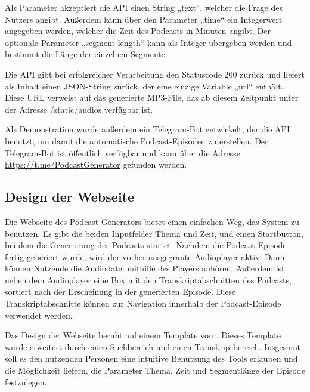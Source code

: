 Als Parameter akzeptiert die API einen String „text“, welcher die Frage des Nutzers angibt.
Außerdem kann über den Parameter „time“ ein Integerwert angegeben werden, welcher die Zeit des Podcasts in Minuten angibt.
Der optionale Parameter „segment-length“ kann als Integer übergeben werden und bestimmt die Länge der einzelnen Segmente.

Die API gibt bei erfolgreicher Verarbeitung den Statuscode 200 zurück und liefert als Inhalt einen JSON-String zurück, der eine einzige Variable „url“ enthält.
Diese URL verweist auf das generierte MP3-File, das ab diesem Zeitpunkt unter der Adresse /static/audios verfügbar ist.

Als Demonstration wurde außerdem ein Telegram-Bot entwickelt, der die API benutzt, um damit die automatische Podcast-Episoden zu erstellen.
Der Telegram-Bot ist öffentlich verfügbar und kann über die Adresse \url{https://t.me/PodcastGenerator} gefunden werden.

\subsection{Design der Webseite}

Die Webseite des Podcast-Generators bietet einen einfachen Weg, das System zu benutzen.
Es gibt die beiden Inputfelder Thema und Zeit, und einen Startbutton, bei dem die Generierung der Podcasts startet.
Nachdem die Podcast-Episode fertig generiert wurde, wird der vorher ausgegraute Audioplayer aktiv.
Dann können Nutzende die Audiodatei mithilfe des Players anhören.
Außerdem ist neben dem Audioplayer eine Box mit den Transkriptabschnitten des Podcasts, sortiert nach der Erscheinung in der generierten Episode.
Diese Transkriptabschnitte können zur Navigation innerhalb der Podcast-Episode verwendet werden.

Das Design der Webseite beruht auf einem Template von \cite{erdem2024}.
Dieses Template wurde erweitert durch einen Suchbereich und einen Transkriptbereich.
Insgesamt soll es den nutzenden Personen eine intuitive Benutzung des Tools erlauben und die Möglichkeit liefern, die Parameter Thema, Zeit und Segmentlänge der Episode festzulegen.

